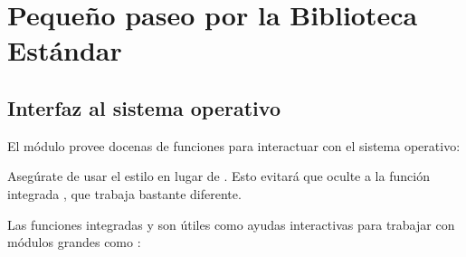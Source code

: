 \documentclass[a4,10pt,spanish]{sphinxmanual}
\begin{document}
\chapter{Pequeño paseo por la Biblioteca Estándar}
\label{\detokenize{tutorial/stdlib:brief-tour-of-the-standard-library}}\label{\detokenize{tutorial/stdlib:tut-brieftour}}\label{\detokenize{tutorial/stdlib::doc}}

\section{Interfaz al sistema operativo}
\label{\detokenize{tutorial/stdlib:operating-system-interface}}\label{\detokenize{tutorial/stdlib:tut-os-interface}}
\sphinxAtStartPar
El módulo  provee docenas de funciones para interactuar con el sistema operativo:

\begin{sphinxVerbatim}[commandchars=\\\{\}]
 
      
   
   
\end{sphinxVerbatim}

\sphinxAtStartPar
Asegúrate de usar el estilo  en lugar de . Esto evitará que  oculte a la función integrada , que trabaja bastante diferente.

\ignorespaces 
\sphinxAtStartPar
Las funciones integradas  y  son útiles como ayudas interactivas para trabajar con módulos grandes como :
\end{document}
